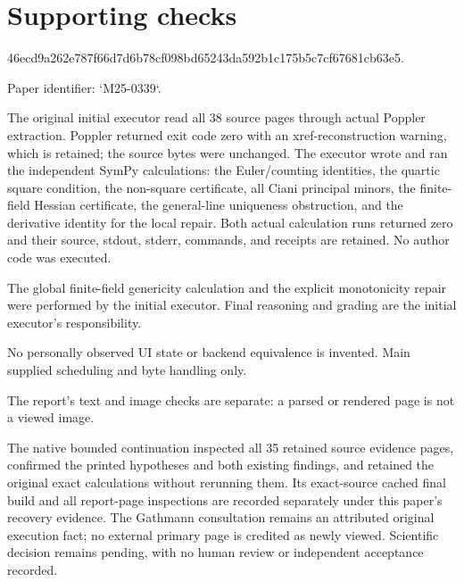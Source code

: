 \documentclass[10pt]{article}
\begin{document}
\section*{Supporting checks}
46ecd9a262e787f66d7d6b78cf098bd65243da592b1c175b5c7cf67681cb63e5.\par
Paper identifier: `M25-0339`.\par
The original initial executor read all 38 source pages through actual Poppler extraction. Poppler returned exit code zero with an xref-reconstruction warning, which is retained; the source bytes were unchanged. The executor wrote and ran the independent SymPy calculations: the Euler/counting identities, the quartic square condition, the non-square certificate, all Ciani principal minors, the finite-field Hessian certificate, the general-line uniqueness obstruction, and the derivative identity for the local repair. Both actual calculation runs returned zero and their source, stdout, stderr, commands, and receipts are retained. No author code was executed.\par
The global finite-field genericity calculation and the explicit monotonicity repair were performed by the initial executor. Final reasoning and grading are the initial executor’s responsibility.\par
No personally observed UI state or backend equivalence is invented. Main supplied scheduling and byte handling only.\par
The report’s text and image checks are separate: a parsed or rendered page is not a viewed image.\par
The native bounded continuation inspected all 35 retained source evidence pages, confirmed the printed hypotheses and both existing findings, and retained the original exact calculations without rerunning them. Its exact-source cached final build and all report-page inspections are recorded separately under this paper’s recovery evidence. The Gathmann consultation remains an attributed original execution fact; no external primary page is credited as newly viewed. Scientific decision remains pending, with no human review or independent acceptance recorded.\par
\end{document}
